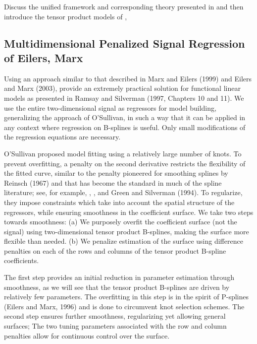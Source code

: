 \documentclass[12pt]{article}
\newcommand*\needsparaphrased{\color{red}}
\newcommand*\outlineskeleton{\color{green}}
\begin{document}
{\outlineskeleton Discuss the unified framework and corresponding theory presented in \cite{huang2001concave} and then introduce the tensor product models of \cite{eilers2003multivariate}, \cite{marx2005multidimensional}}


\subsection{{\outlineskeleton Multidimensional Penalized Signal Regression of Eilers, Marx}}

{\needsparaphrased Using an approach similar to that described in Marx and Eilers (1999) and Eilers and Marx (2003), \cite{marx2005multidimensional} provide an extremely practical solution for functional linear models as presented in Ramsay and Silverman (1997, Chapters 10 and 11). We use the entire two-dimensional signal as regressors for model building, generalizing the approach of O'Sullivan, in such a way that it can be applied in any context where regression on B-splines is useful. Only small modifications of the regression equations are necessary. 

O'Sullivan proposed model fitting using a relatively large number of knots. To prevent overfitting, a penalty on the second derivative restricts the flexibility of the fitted curve, similar to the penalty pioneered for smoothing splines by Reinsch (1967) and that has become the standard in much of the spline literature; see, for example, \cite{eubank1999nonparametric}, \cite{craven1978smoothing}, \cite{wahba1990spline} and Green and Silverman (1994). To regularize, they impose constraints which take into account the spatial structure of the regressors, while ensuring smoothness in the coefficient surface. We take two steps towards smoothness: (a) We purposely overfit the coefficient surface (not the signal) using two-dimensional tensor product B-splines, making the surface more flexible than needed. (b) We penalize estimation of the surface using difference penalties on each of the rows and columns of the tensor product B-spline coefficients.

The first step provides an initial reduction in parameter estimation through smoothness, as we will see that the tensor product B-splines are driven by relatively few parameters. The overfitting in this step is in the spirit of P-splines (Eilers and Marx, 1996) and is done to circumvent knot selection schemes. The second step ensures further smoothness, regularizing yet allowing general surfaces; The two tuning parameters associated with the row and column penalties allow for continuous control over the surface. 

}
\end{document}
